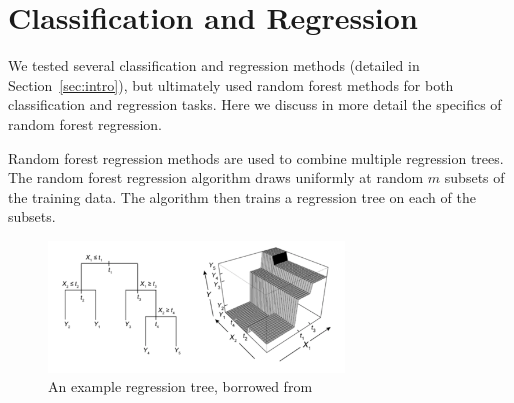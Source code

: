\documentclass{article} %
\begin{document}





\section{Classification and Regression}
\label{sec:regression}

We tested several classification and regression methods (detailed in Section~\ref{sec:intro}), but ultimately used random forest methods for both classification and regression tasks. Here we discuss in more detail the specifics of random forest regression.

Random forest regression methods are used to combine multiple regression trees. The random forest regression algorithm draws uniformly at random $m$ subsets of the training data. The algorithm then trains a regression tree on each of the subsets.

\begin{figure}[H]
  \centering
  \includegraphics[width=0.7\textwidth]{rf.png}
  \caption{An example regression tree, borrowed from \cite{rffig}}
  \label{fig:regtree}
\end{figure}
\end{document}
